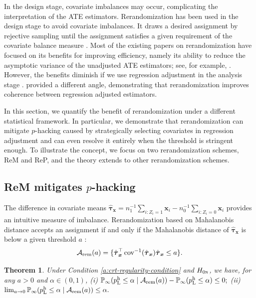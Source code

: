 \documentclass[12pt]{article}
\newtheorem{theorem}{Theorem}
\newcommand{\Prob}{\mathbb{P}}
\newcommand{\cov}{\operatorname{cov}}
\newcommand{\ma}{\mathcal{A}}
\newcommand{\rem}{\textnormal{rem}}
\newcommand{\bs}{\boldsymbol}
\newcommand{\hpL}{p_\textnormal{L}^{\textnormal{h}}}
\begin{document}
In the design stage, covariate imbalances may occur, complicating the interpretation of the ATE estimators. Rerandomization has been used in the design stage to avoid covariate imbalances. It draws a desired assignment by rejective sampling until the assignment satisfies a given requirement of the covariate balance measure \citep{cox1982randomization,morgan2012rerandomization}.  Most of the existing papers on rerandomization have focused on its benefits for improving efficiency, namely its ability to reduce the asymptotic variance of the unadjusted ATE estimators; see, for example, \citet{Li9157,wang2021rerandomization}. However, the benefits diminish if we use regression adjustment in the analysis stage \citep{2020Rerandomization}. \citet{zdrep} provided a different angle, demonstrating that rerandomization improves coherence between regression adjusted estimators. 

In this section, we quantify the benefit of rerandomization under a different statistical framework. In particular, we demonstrate that rerandomization can mitigate $p$-hacking caused by strategically selecting covariates in regression adjustment and can even resolve it entirely when the threshold is stringent enough. To illustrate the concept, we focus on two
rerandomization schemes, ReM and ReP, and the theory extends to other rerandomization schemes.
 

\subsection{ReM mitigates $p$-hacking}

  The difference in covariate means $\hat{\bs{\tau}}_{\bs{x}} = n_1^{-1}\sum_{i:Z_i=1}\bs{x}_i-n_0^{-1}\sum_{i:Z_i=0}\bs{x}_i$ provides an intuitive measure of imbalance. Rerandomization based on Mahalanobis distance accepts an assignment if and only if the Mahalanobis distance of $\hat{\bs{\tau}}_{\bs{x}}$ is below a given threshold $a$ \citep{morgan2012rerandomization}: $$\ma_{\rem}(a) = \{\hat{\bs{\tau}}_{\bs{x}}^\top \cov^{-1}(\hat{\bs{\tau}}_{\bs{x}})\hat{\bs{\tau}}_{\bs{x}}\leq a\}.$$ 

\begin{theorem}
\label{thm:rem-mitigates-p-hacking}
    Under Condition \ref{a:crt-regularity-condition} and $H_{0\textsc{n}}$, we have, for any $a>0 $ and $\alpha\in (0,1) $, (i)
    $\Prob_{\infty}( \hpL \leq \alpha\mid \ma_{\rem}(a)) -\Prob_{\infty}( \hpL \leq \alpha) \leq 0;$
    (ii) $ \lim_{a\rightarrow 0}\Prob_{\infty}( \hpL \leq \alpha \mid \ma_{\rem}(a)) \leq \alpha.$
\end{theorem}
\end{document}
